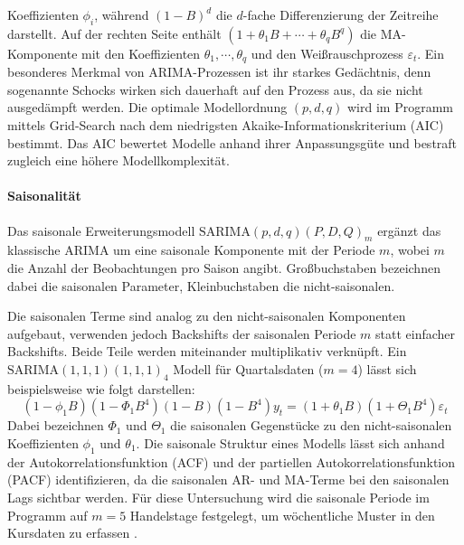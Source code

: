 Koeffizienten $\phi_i$, während $(1-B)^d$ die $d$-fache Differenzierung der Zeitreihe darstellt. Auf der rechten Seite enthält $(1 + \theta_1 B + \cdots + \theta_q B^q)$ die MA-Komponente mit den Koeffizienten $\theta_1 , \cdots , \theta_q$ und den Weißrauschprozess $\varepsilon_t$. Ein besonderes Merkmal von ARIMA-Prozessen ist ihr starkes Gedächtnis, denn sogenannte Schocks wirken sich dauerhaft auf den Prozess aus, da sie nicht ausgedämpft werden. Die optimale Modellordnung $(p, d, q)$ wird im Programm mittels Grid-Search nach dem niedrigsten Akaike-Informationskriterium (AIC) bestimmt. Das AIC bewertet Modelle anhand ihrer Anpassungsgüte und bestraft zugleich eine höhere Modellkomplexität. \cite[Kapitel 9.5,9.6]{fpp}

\paragraph{Saisonalität}
Das saisonale Erweiterungsmodell $\mathrm{SARIMA}(p,d,q)(P,D,Q)_m$ ergänzt das klassische ARIMA um eine saisonale Komponente mit der Periode $m$, wobei $m$ die Anzahl der Beobachtungen pro Saison angibt. Großbuchstaben bezeichnen dabei die saisonalen Parameter, Kleinbuchstaben die nicht-saisonalen.

Die saisonalen Terme sind analog zu den nicht-saisonalen Komponenten aufgebaut, verwenden jedoch Backshifts der saisonalen Periode $m$ statt einfacher Backshifts. Beide Teile werden miteinander multiplikativ verknüpft. Ein $\mathrm{SARIMA}(1,1,1)(1,1,1)_4$ Modell für Quartalsdaten ($m=4$) lässt sich beispielsweise wie folgt darstellen:
\begin{equation}
    (1-\phi_1 B)(1-\Phi_1 B^4)(1-B)(1-B^4)y_t = (1+\theta_1 B)(1+\Theta_1 B^4)\varepsilon_t
\end{equation}
Dabei bezeichnen $\Phi_1$ und $\Theta_1$ die saisonalen Gegenstücke zu den nicht-saisonalen Koeffizienten $\phi_1$ und $\theta_1$. Die saisonale Struktur eines Modells lässt sich anhand der Autokorrelationsfunktion (ACF) und der partiellen Autokorrelationsfunktion (PACF) identifizieren, da die saisonalen AR- und MA-Terme bei den saisonalen Lags sichtbar werden. Für diese Untersuchung wird die saisonale Periode im Programm auf $m = 5$ Handelstage festgelegt, um wöchentliche Muster in den Kursdaten zu erfassen \cite[Kapitel 9.9]{fpp}.

